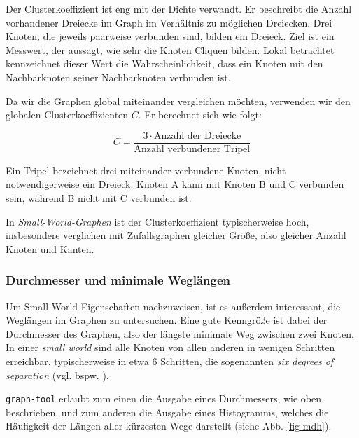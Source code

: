 \documentclass[11pt, a4paper]{article}
\begin{document}
Der Clusterkoeffizient ist eng mit der Dichte verwandt. Er beschreibt die
Anzahl vorhandener Dreiecke im Graph im Verhältnis zu möglichen Dreiecken. Drei
Knoten, die jeweils paarweise verbunden sind, bilden ein Dreieck. Ziel ist ein
Messwert, der aussagt, wie sehr die Knoten Cliquen bilden. Lokal betrachtet
kennzeichnet dieser Wert die Wahrscheinlichkeit, dass ein Knoten mit den
Nachbarknoten seiner Nachbarknoten verbunden ist.

Da wir die Graphen global miteinander vergleichen möchten, verwenden wir den
globalen Clusterkoeffizienten $C$. Er berechnet sich wie folgt:

$$
    C = \frac{3\cdot\text{Anzahl der Dreiecke}}{\text{Anzahl verbundener Tripel}}
$$

Ein Tripel bezeichnet drei miteinander verbundene Knoten, nicht
notwendigerweise ein Dreieck. Knoten A kann mit Knoten B und C verbunden sein,
während B nicht mit C verbunden ist.

In \emph{Small-World-Graphen} ist der Clusterkoeffizient typischerweise hoch, 
insbesondere verglichen mit Zufallsgraphen gleicher Größe, also gleicher Anzahl
Knoten und Kanten\cite{Newman2003}.\\


\subsubsection{Durchmesser und minimale Wegl\"angen}
Um Small-World-Eigenschaften nachzuweisen, ist es außerdem interessant, die
Weglängen im Graphen zu untersuchen. Eine gute Kenngröße ist dabei der Durchmesser
des Graphen, also der längste minimale Weg zwischen zwei Knoten. In einer
\emph{small world} sind alle Knoten von allen anderen in wenigen Schritten
erreichbar, typischerweise in etwa 6 Schritten, die sogenannten 
\emph{six degrees of separation} (vgl. bspw. \cite{Newman2003}).

\texttt{graph-tool} erlaubt zum einen die Ausgabe eines Durchmessers, wie oben
 beschrieben, und zum anderen die Ausgabe eines Histogramms, welches die 
Häufigkeit der Längen aller kürzesten Wege darstellt (siehe Abb. \ref{fig-mdh}).
\end{document}
